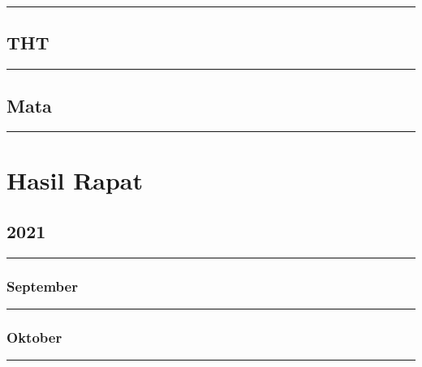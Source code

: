 \documentclass[
]{book}
\begin{document}
\begin{center}\rule{0.5\linewidth}{0.5pt}\end{center}

\hypertarget{tht-1}{%
\section{THT}\label{tht-1}}

\begin{center}\rule{0.5\linewidth}{0.5pt}\end{center}

\hypertarget{mata-1}{%
\section{Mata}\label{mata-1}}

\begin{center}\rule{0.5\linewidth}{0.5pt}\end{center}

\hypertarget{hasil-rapat}{%
\chapter{Hasil Rapat}\label{hasil-rapat}}

\hypertarget{section}{%
\section{2021}\label{section}}

\begin{center}\rule{0.5\linewidth}{0.5pt}\end{center}

\hypertarget{september}{%
\subsection{September}\label{september}}

\begin{center}\rule{0.5\linewidth}{0.5pt}\end{center}

\hypertarget{oktober}{%
\subsection{Oktober}\label{oktober}}

\begin{center}\rule{0.5\linewidth}{0.5pt}\end{center}
\end{document}
